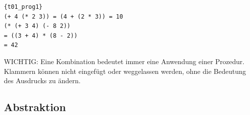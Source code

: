 \begin{lstlisting}{t01_prog1}
(+ 4 (* 2 3)) = (4 + (2 * 3)) = 10
(* (+ 3 4) (- 8 2))
= ((3 + 4) * (8 - 2))
= 42
\end{lstlisting}

WICHTIG:
 Eine Kombination bedeutet immer eine Anwendung einer Prozedur. Klammern können nicht eingefügt oder weggelassen werden, ohne die Bedeutung des Ausdrucks zu ändern.

\subsection{Abstraktion}
